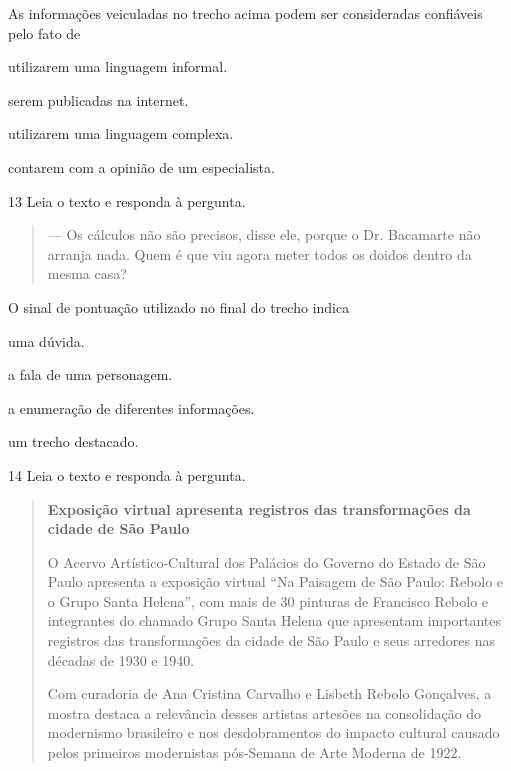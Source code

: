 As informações veiculadas no trecho acima podem ser consideradas
confiáveis pelo fato de

\begin{escolha}
  \item utilizarem uma linguagem informal.

  \item serem publicadas na internet.

  \item utilizarem uma linguagem complexa.

  \item contarem com a opinião de um especialista.
\end{escolha}

\num{13} Leia o texto e responda à pergunta.

\begin{quote}
--- Os cálculos não são precisos, disse ele, porque o Dr. Bacamarte não
arranja nada. Quem é que viu agora meter todos os doidos dentro da mesma
casa?
\end{quote}


O sinal de pontuação utilizado no final do trecho indica

\begin{escolha}
  \item uma dúvida.

  \item a fala de uma personagem.

  \item a enumeração de diferentes informações.

  \item um trecho destacado.
\end{escolha}

\num{14} Leia o texto e responda à pergunta.

\begin{quote}
\textbf{Exposição virtual apresenta registros das transformações 
da cidade de São Paulo}

O Acervo Artístico-Cultural dos Palácios do Governo do Estado de São
Paulo apresenta a exposição virtual ``Na Paisagem de São Paulo: Rebolo e
o Grupo Santa Helena'', com mais de 30 pinturas de Francisco Rebolo e
integrantes do chamado Grupo Santa Helena que apresentam importantes
registros das transformações da cidade de São Paulo e seus arredores nas
décadas de 1930 e 1940.

Com curadoria de Ana Cristina Carvalho e Lisbeth Rebolo Gonçalves, a
mostra destaca a relevância desses artistas artesões na consolidação do
modernismo brasileiro e nos desdobramentos do impacto cultural causado
pelos primeiros modernistas pós-Semana de Arte Moderna de 1922.
\end{quote}

